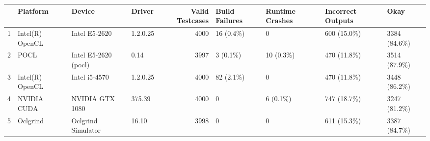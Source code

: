 \begin{tabular}{llllrllll}
\toprule
{} &         Platform &                Device &    Driver &  Valid Testcases & Build Failures & Runtime Crashes & Incorrect Outputs &          Okay \\
\midrule
1 &  Intel(R) OpenCL &         Intel E5-2620 &  1.2.0.25 &             4000 &      16 (0.4\%) &               0 &       600 (15.0\%) &  3384 (84.6\%) \\
2 &             POCL &  Intel E5-2620 (pocl) &      0.14 &             3997 &       3 (0.1\%) &       10 (0.3\%) &       470 (11.8\%) &  3514 (87.9\%) \\
3 &  Intel(R) OpenCL &         Intel i5-4570 &  1.2.0.25 &             4000 &      82 (2.1\%) &               0 &       470 (11.8\%) &  3448 (86.2\%) \\
4 &      NVIDIA CUDA &       NVIDIA GTX 1080 &    375.39 &             4000 &              0 &        6 (0.1\%) &       747 (18.7\%) &  3247 (81.2\%) \\
5 &         Oclgrind &    Oclgrind Simulator &     16.10 &             3998 &              0 &               0 &       611 (15.3\%) &  3387 (84.7\%) \\
\bottomrule
\end{tabular}

